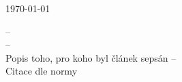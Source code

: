 \documentclass[main.tex]{subfiles}
\begin{document}
\pagestyle{empty}

\begin{titlepage}
\centering
\vspace*{2cm}
{\color{WPP}\Huge \textbf{\WSname}}\\
\vspace{0.5cm}
{\color{WPP}\Large \WSauthor}\\
\vspace{1.5cm}
{\color{WPP}\textbf{\WSsubtitle}}\\
\vfill
{\color{WPP}\WSsubject}\\
\vspace{0.8cm}
{\color{WPP}\WSuniversity}\\
{\color{WPP}\today}
\end{titlepage}

\newpage

\vspace*{\fill}

\begin{flushright}
 -- \lipsum[1]\\
\vspace*{1em}
 -- \lipsum[1]\\
\vspace*{1em}
Popis toho, pro koho byl článek sepsán -- \lipsum[1]\\
\vspace*{1em}
Citace dle normy
\end{flushright}

\newpage
\end{document}
